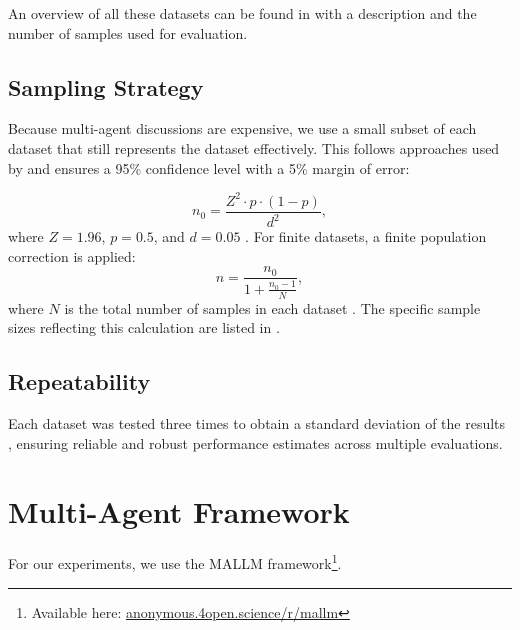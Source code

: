An overview of all these datasets can be found in  with a description and the number of samples used for evaluation.

\subsection{Sampling Strategy}
Because multi-agent discussions are expensive, we use a small subset of each dataset that still represents the dataset effectively. This follows approaches used by \citet{yin_exchange--thought_2023, chen_reconcile_2024, becker_multi-agent_2024} and ensures a 95\% confidence level with a 5\% margin of error:

\[
n_0 = \frac{Z^2 \cdot p \cdot (1 - p)}{d^2},
\]
where \(Z = 1.96\), \(p = 0.5\), and \(d = 0.05\) \citep{thompson_sampling_2012}. For finite datasets, a finite population correction is applied:
\[
n = \frac{n_0}{1 + \frac{n_0 - 1}{N}},
\]
where \(N\) is the total number of samples in each dataset \citep{cochran_sampling_1953}. The specific sample sizes reflecting this calculation are listed in .

\subsection{Repeatability}
Each dataset was tested three times to obtain a standard deviation of the results \citep{reimers_reporting_2017, chen_reconcile_2024, becker_multi-agent_2024}, ensuring reliable and robust performance estimates across multiple evaluations.



\section{Multi-Agent Framework}
\label{sec:mallm}
For our experiments, we use the \ac{MALLM} framework\footnote{Available here: \href{https://anonymous.4open.science/r/mallm}{anonymous.4open.science/r/mallm}}.

